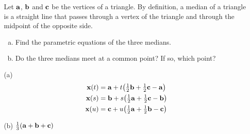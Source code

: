 \begin{question}
Let $\mathbf{a}$, $\mathbf{b}$ and $\mathbf{c}$ be the vertices of a triangle. By definition, 
a median of a triangle is a straight line that passes through a vertex of 
the triangle and through the midpoint of the opposite side.
\begin{enumerate}[(a)]
\item
 Find the parametric equations of the three medians.
\item
 Do the three medians meet at a common point? If so, which point? 
\end{enumerate}
\end{question}


\begin{answer}
(a)
\begin{align*}
\mathbf{x}(t)&=\mathbf{a}+t\big(\tfrac{1}{2}\mathbf{b}+\tfrac{1}{2}\mathbf{c}-\mathbf{a}\big)\\
\mathbf{x}(s)&=\mathbf{b}+s\big(\tfrac{1}{2}\mathbf{a}+\tfrac{1}{2}\mathbf{c}-\mathbf{b}\big)\\
\mathbf{x}(u)&=\mathbf{c}+u\big(\tfrac{1}{2}\mathbf{a}+\tfrac{1}{2}\mathbf{b}-\mathbf{c}\big)
\end{align*}

(b)
$\frac{1}{3}(\mathbf{a}+\mathbf{b}+\mathbf{c})$
\end{answer}


